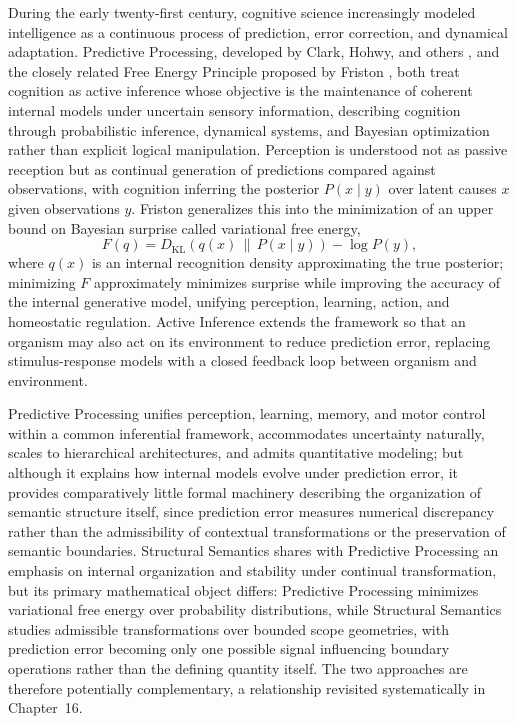 \documentclass[11pt,twoside,openright]{book}
\numberwithin{equation}{chapter}
\theoremstyle{definition}
\theoremstyle{plain}
\theoremstyle{remark}
\theoremstyle{definition}
\begin{document}
During the early twenty-first century, cognitive science increasingly
modeled intelligence as a continuous process of prediction, error
correction, and dynamical adaptation. Predictive Processing, developed by
Clark, Hohwy, and others \cite{Clark2013,Hohwy2013}, and the closely
related Free Energy Principle proposed by Friston \cite{Friston2010,
Friston2019}, both treat cognition as active inference whose objective is
the maintenance of coherent internal models under uncertain sensory
information, describing cognition through probabilistic inference,
dynamical systems, and Bayesian optimization rather than explicit logical
manipulation. Perception is understood not as passive reception but as
continual generation of predictions compared against observations, with
cognition inferring the posterior $P(x\mid y)$ over latent causes $x$
given observations $y$. Friston generalizes this into the minimization of
an upper bound on Bayesian surprise called variational free energy,
\[
F(q)=D_{\mathrm{KL}}\!\left(q(x)\,\middle\|\,P(x\mid y)\right)-\log P(y),
\]
where $q(x)$ is an internal recognition density approximating the true
posterior; minimizing $F$ approximately minimizes surprise while
improving the accuracy of the internal generative model, unifying
perception, learning, action, and homeostatic regulation. Active
Inference extends the framework so that an organism may also act on its
environment to reduce prediction error, replacing stimulus-response
models with a closed feedback loop between organism and environment.

Predictive Processing unifies perception, learning, memory, and motor
control within a common inferential framework, accommodates uncertainty
naturally, scales to hierarchical architectures, and admits quantitative
modeling; but although it explains how internal models evolve under
prediction error, it provides comparatively little formal machinery
describing the organization of semantic structure itself, since
prediction error measures numerical discrepancy rather than the
admissibility of contextual transformations or the preservation of
semantic boundaries. Structural Semantics shares with Predictive
Processing an emphasis on internal organization and stability under
continual transformation, but its primary mathematical object differs:
Predictive Processing minimizes variational free energy over probability
distributions, while Structural Semantics studies admissible
transformations over bounded scope geometries, with prediction error
becoming only one possible signal influencing boundary operations rather
than the defining quantity itself. The two approaches are therefore
potentially complementary, a relationship revisited systematically in
Chapter~16.
\end{document}
